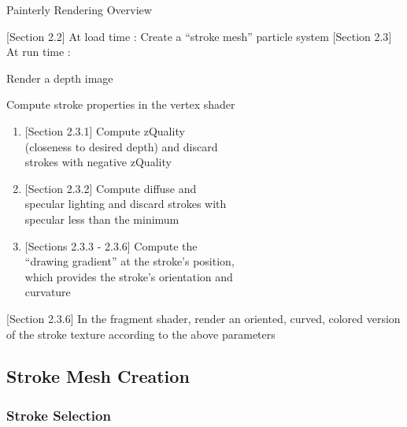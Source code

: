 \documentclass[conference]{acmsiggraph}
\begin{document}
\begin{algorithm}
\DontPrintSemicolon
\caption{Painterly Rendering Overview}
  {[}Section 2.2{]} At load time :  {
     {
      Create a ``stroke mesh'' particle system
    }
  }
  {[}Section 2.3{]} At run time :  {
    Render a depth image \\
     {

       {

         {
          Compute stroke properties in the vertex shader \\
          \begin{enumerate}
            \item {[}Section 2.3.1{]} Compute zQuality \\(closeness to
              desired depth) and discard \\ strokes with negative zQuality
            \item  {[}Section 2.3.2{]} Compute diffuse and \\ specular
              lighting and discard strokes with \\ specular less than the
              minimum
            \item {[}Sections 2.3.3 - 2.3.6{]} Compute the \\
              ``drawing gradient'' at the stroke's position, \\ which provides
              the stroke's orientation and \\ curvature
          \end{enumerate}

          {[}Section 2.3.6{]} In the fragment shader, render an oriented,
          curved, colored version of the stroke texture according to the
          above parameters
        }

      }

    }
  }
\end{algorithm}


\subsection{Stroke Mesh Creation}

\subsubsection{Stroke Selection}
\end{document}
